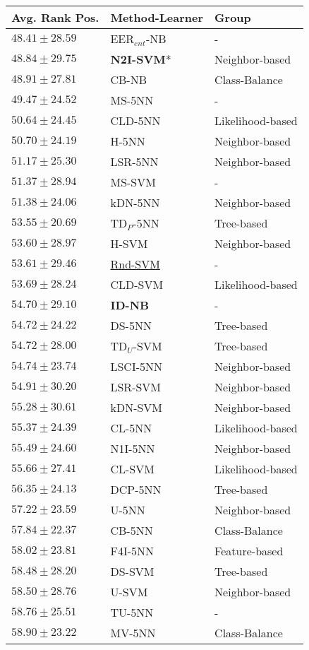 \begin{tabular}{lll}
\toprule
Avg. Rank Pos. & Method-Learner & Group \\
\midrule
$48.41\pm28.59$ & EER$_{ent}$-NB & - \\
$48.84\pm29.75$ & \textbf{N2I-SVM}* & Neighbor-based \\
$48.91\pm27.81$ & CB-NB & Class-Balance \\
$49.47\pm24.52$ & MS-5NN & - \\
$50.64\pm24.45$ & CLD-5NN & Likelihood-based \\
$50.70\pm24.19$ & H-5NN & Neighbor-based \\
$51.17\pm25.30$ & LSR-5NN & Neighbor-based \\
$51.37\pm28.94$ & MS-SVM & - \\
$51.38\pm24.06$ & kDN-5NN & Neighbor-based \\
$53.55\pm20.69$ & TD$_P$-5NN & Tree-based \\
$53.60\pm28.97$ & H-SVM & Neighbor-based \\
$53.61\pm29.46$ & \underline{Rnd-SVM} & - \\
$53.69\pm28.24$ & CLD-SVM & Likelihood-based \\
$54.70\pm29.10$ & \textbf{ID-NB} & - \\
$54.72\pm24.22$ & DS-5NN & Tree-based \\
$54.72\pm28.00$ & TD$_U$-SVM & Tree-based \\
$54.74\pm23.74$ & LSCI-5NN & Neighbor-based \\
$54.91\pm30.20$ & LSR-SVM & Neighbor-based \\
$55.28\pm30.61$ & kDN-SVM & Neighbor-based \\
$55.37\pm24.39$ & CL-5NN & Likelihood-based \\
$55.49\pm24.60$ & N1I-5NN & Neighbor-based \\
$55.66\pm27.41$ & CL-SVM & Likelihood-based \\
$56.35\pm24.13$ & DCP-5NN & Tree-based \\
$57.22\pm23.59$ & U-5NN & Neighbor-based \\
$57.84\pm22.37$ & CB-5NN & Class-Balance \\
$58.02\pm23.81$ & F4I-5NN & Feature-based \\
$58.48\pm28.20$ & DS-SVM & Tree-based \\
$58.50\pm28.76$ & U-SVM & Neighbor-based \\
$58.76\pm25.51$ & TU-5NN & - \\
$58.90\pm23.22$ & MV-5NN & Class-Balance \\

\end{tabular}
